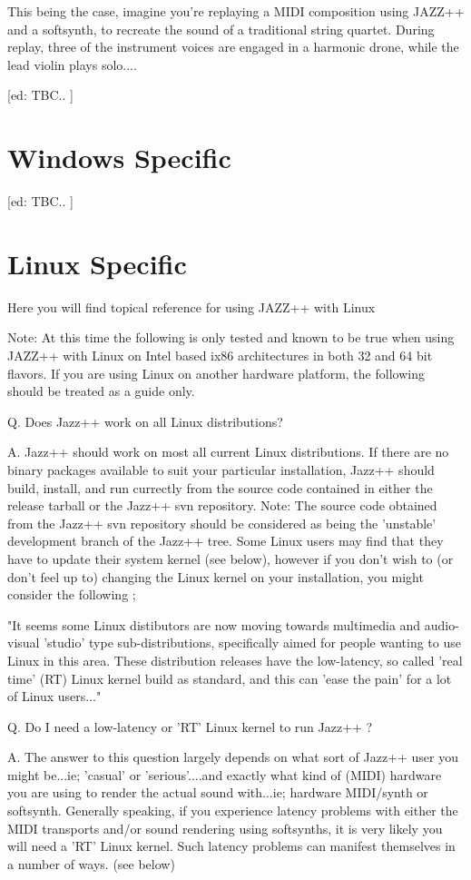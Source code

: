 \documentclass[letterpaper]{report}
\begin{document}
This being the case, imagine you're replaying a MIDI composition using JAZZ++
and a softsynth, to recreate the sound of a traditional string quartet. During
replay, three of the instrument voices are engaged in a harmonic drone, while
the lead violin plays solo.... 

[ed: TBC.. ]

\section{Windows Specific}

[ed: TBC.. ]

\section{Linux Specific}

Here you will find topical reference for using JAZZ++ with Linux

Note: At this time the following is only tested and known to be true when using
JAZZ++ with Linux on Intel based ix86 architectures in both 32 and 64 bit
flavors. If you are using Linux on another hardware platform, the following
should be treated as a guide only. 

Q. Does Jazz++ work on all Linux distributions?

A. Jazz++ should work on most all current Linux distributions. If there are
no binary packages available to suit your particular installation, Jazz++
should build, install, and run currectly from the source code contained in
either the release tarball or the Jazz++ svn repository. Note: The source 
code obtained from the Jazz++ svn repository should be considered as being
the 'unstable' development branch of the Jazz++ tree. Some Linux users may
find that they have to update their system kernel (see below), however if
you don't wish to (or don't feel up to) changing the Linux kernel on your
installation, you might consider the following ;

  "It seems some Linux distibutors are now moving towards multimedia and
  audio-visual 'studio' type sub-distributions, specifically aimed for
  people wanting to use Linux in this area. These distribution releases
  have the low-latency, so called 'real time' (RT) Linux kernel build as
  standard, and this can 'ease the pain' for a lot of Linux users..."

  
Q. Do I need a low-latency or 'RT' Linux kernel to run Jazz++ ?

A. The answer to this question largely depends on what sort of Jazz++
user you might be...ie; 'casual' or 'serious'....and exactly what kind
of (MIDI) hardware you are using to render the actual sound with...ie;
hardware MIDI/synth or softsynth. Generally speaking, if you experience
latency problems with either the MIDI transports and/or sound rendering
using softsynths, it is very likely you will need a 'RT' Linux kernel.
Such latency problems can manifest themselves in a number of ways. (see below)
\end{document}
